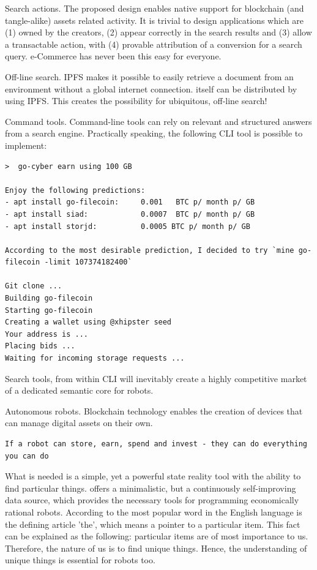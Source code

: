 \documentclass[8pt,oneside]{amsart}
\newcommand{\linkred}[2]{\href{#1}{\color{red}{#2}}}
\begin{document}
Search actions. The proposed design enables native support for blockchain (and tangle-alike) assets related activity. It is trivial to design applications which are (1) owned by the creators, (2) appear correctly in the search results and (3) allow a transactable action, with (4) provable attribution of a conversion for a search query. e-Commerce has never been this easy for everyone.

Off-line search. IPFS makes it possible to easily retrieve a document from an environment without a global internet connection. \linkred{https://github.com/cybercongress/go-cyber}{go-cyber} itself can be distributed by using IPFS. This creates the possibility for ubiquitous, off-line search!

Command tools. Command-line tools can rely on relevant and structured answers from a search engine. Practically speaking, the following CLI tool is possible to implement:

\begin{lstlisting}
>  go-cyber earn using 100 GB

Enjoy the following predictions:
- apt install go-filecoin:     0.001   BTC p/ month p/ GB
- apt install siad:            0.0007  BTC p/ month p/ GB
- apt install storjd:          0.0005 BTC p/ month p/ GB

According to the most desirable prediction, I decided to try `mine go-filecoin -limit 107374182400`

Git clone ...
Building go-filecoin
Starting go-filecoin
Creating a wallet using @xhipster seed
Your address is ...
Placing bids ...
Waiting for incoming storage requests ...
\end{lstlisting}

Search tools, from within CLI will inevitably create a highly competitive market of a dedicated semantic core for robots.

Autonomous robots. Blockchain technology enables the creation of devices that can manage digital assets on their own.

\begin{lstlisting}
If a robot can store, earn, spend and invest - they can do everything you can do
\end{lstlisting}

What is needed is a simple, yet a powerful state reality tool with the ability to find particular things. \linkred{https://github.com/cybercongress/go-cyber}{go-cyber} offers a minimalistic, but a continuously self-improving data source, which provides the necessary tools for programming economically rational robots. According to \linkred{https://github.com/first20hours/google-10000-english}{top-10,000 English words} the most popular word in the English language is the defining article 'the', which means a pointer to a particular item. This fact can be explained as the following: particular items are of most importance to us. Therefore, the nature of us is to find unique things. Hence, the understanding of unique things is essential for robots too.
\end{document}
